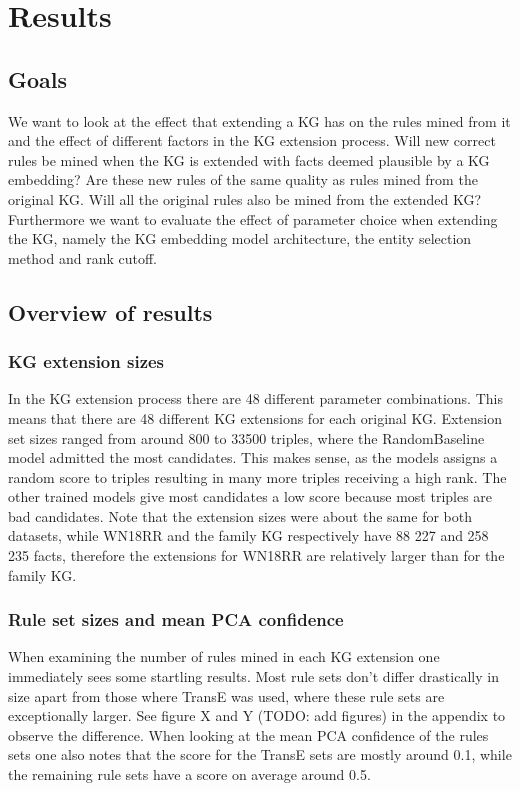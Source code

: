 \chapter{Results}

\section{Goals}
We want to look at the effect that extending a KG has on the rules mined from it and the effect of different factors in the KG extension process. Will new correct rules be mined when the KG is extended with facts deemed plausible by a KG embedding? Are these new rules of the same quality as rules mined from the original KG. Will all the original rules also be mined from the extended KG? Furthermore we want to evaluate the effect of parameter choice when extending the KG, namely the KG embedding model architecture, the entity selection method and rank cutoff.

\section{Overview of results}

\subsection{KG extension sizes}
In the KG extension process there are 48 different parameter combinations. This means that there are 48 different KG extensions for each original KG. Extension set sizes ranged from around 800 to 33500 triples, where the RandomBaseline model admitted the most candidates. This makes sense, as the models assigns a random score to triples resulting in many more triples receiving a high rank. The other trained models give most candidates a low score because most triples are bad candidates. Note that the extension sizes were about the same for both datasets, while WN18RR and the family KG respectively have 88 227 and 258 235 facts, therefore the extensions for WN18RR are relatively larger than for the family KG.

\subsection{Rule set sizes and mean PCA confidence}
When examining the number of rules mined in each KG extension one immediately sees some startling results. Most rule sets don't differ drastically in size apart from those where TransE was used, where these rule sets are exceptionally larger. See figure X and Y (TODO: add figures) in the appendix to observe the difference. When looking at the mean PCA confidence of the rules sets one also notes that the score for the TransE sets are mostly around 0.1, while the remaining rule sets have a score on average around 0.5.

